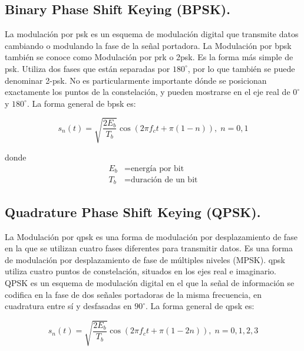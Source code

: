 \subsection*{\fontsize{12}{18}\selectfont Binary Phase Shift Keying (BPSK).}

\begin{justify}
    La modulación por \gls{psk} es un esquema de modulación digital que transmite datos cambiando o modulando la fase de la señal portadora. La Modulación por
    \gls{bpsk} también se conoce como Modulación por \gls{prk} o 2\gls{psk}. Es la forma más simple de \gls{psk}. Utiliza dos fases que están separadas por $180^\circ$,
    por lo que también se puede denominar 2-\gls{psk}. No es particularmente importante dónde se posicionan exactamente los puntos de la constelación, y pueden mostrarse
    en el eje real de $0^\circ$ y $180^\circ$. La forma general de \gls{bpsk} es:

    \begin{equation}
        s_n (t) = \sqrt{\frac{2 E_b}{T_b}} \cos(2 \pi f_c t + \pi (1 - n)),\; n = 0,1
        \label{bpsk}
    \end{equation}

    donde
    \begin{equation*}
        \begin{array}{rl}
            E_b & = \text{energía por bit}\\
            T_b & = \text{duración de un bit}
        \end{array}
    \end{equation*}
\end{justify}

\subsection*{\fontsize{12}{18}\selectfont Quadrature Phase Shift Keying (QPSK).}

\begin{justify}
    La Modulación por \gls{qpsk} es una forma de modulación por desplazamiento de fase en la que se utilizan cuatro fases
    diferentes para transmitir datos. Es una forma de modulación por desplazamiento de fase de múltiples niveles (MPSK). \gls{qpsk} utiliza cuatro puntos de
    constelación, situados en los ejes real e imaginario. QPSK es un esquema de modulación digital en el que la señal de información se codifica en la fase
    de dos señales portadoras de la misma frecuencia, en cuadratura entre sí y desfasadas en $90^\circ$. La forma general de \gls{qpsk} es:

    \begin{equation}
        s_n (t) = \sqrt{\frac{2 E_b}{T_b}} \cos(2 \pi f_c t + \pi (1 - 2n)),\; n = 0,1,2,3
        \label{qpsk}
    \end{equation}
\end{justify}

